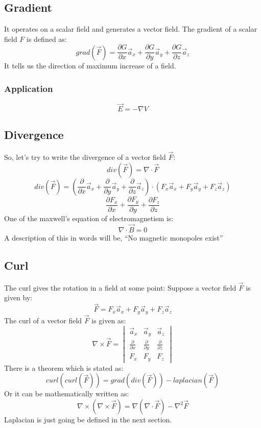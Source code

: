         \subsection{Gradient}
            It operates on a scalar field and generates a vector field. The gradient of a scalar field $F$ is defined as:
            $$grad(\vec{F}) = \frac{\partial G}{\partial x}\vec{a}_x + \frac{\partial G}{\partial y}\vec{a}_y + \frac{\partial G}{\partial z}\vec{a}_z$$
            It tells us the direction of maximum increase of a field.
                \subsubsection{Application}
                    $$\vec{E} = -\nabla V$$
        \subsection{Divergence}
            So, let's try to write the divergence of a vector field $\vec{F}$:
            $$div(\vec{F}) = \nabla \cdot \vec{F}$$
            $$div(\vec{F}) = \left(\frac{\partial}{\partial x}\vec{a}_x + \frac{\partial}{\partial y}\vec{a}_y + \frac{\partial}{\partial z}\vec{a}_z\right) \cdot \left(F_x\vec{a}_x + F_y\vec{a}_y + F_z\vec{a}_z\right)$$
            $$\frac{\partial F_x}{\partial x} + \frac{\partial F_y}{\partial y} + \frac{\partial F_z}{\partial z}$$
            One of the maxwell's equation of electromagnetism is:
            $$\nabla \cdot \vec{B} = 0$$
            A description of this in words will be, ``No magnetic monopoles exist''
        \subsection{Curl}
            The curl gives the rotation in a field at some point:
            Suppose a vector field $\vec{F}$ is given by:
            $$\vec{F} = F_x\vec{a}_x + F_y\vec{a}_y + F_z\vec{a}_z$$
            The curl of a vector field $\vec{F}$ is given as:
            $$\nabla \times \vec{F} =
                \begin{vmatrix}
                    \vec{a}_x & \vec{a}_y & \vec{a}_z \\
                    \frac{\partial}{\partial x} & \frac{\partial}{\partial y} & \frac{\partial}{\partial z} \\
                    F_x & F_y & F_z
                \end{vmatrix}
            $$ 
            There is a theorem which is stated as:
            $$curl(curl(\vec{F})) = grad(div(\vec{F})) - laplacian(\vec{F})$$
            Or it can be mathematically written as:
            $$\nabla\times\left(\nabla \times \vec{F}\right) = \nabla \left(\nabla\cdot\vec{F}\right) - \nabla^2\vec{F}$$
            Laplacian is just going be defined in the next section.
